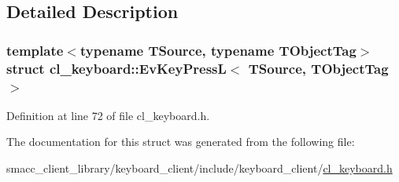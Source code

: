 \subsection{Detailed Description}
\subsubsection*{template$<$typename T\+Source, typename T\+Object\+Tag$>$\newline
struct cl\+\_\+keyboard\+::\+Ev\+Key\+Press\+L$<$ T\+Source, T\+Object\+Tag $>$}



Definition at line 72 of file cl\+\_\+keyboard.\+h.



The documentation for this struct was generated from the following file\+:\begin{DoxyCompactItemize}
\item 
smacc\+\_\+client\+\_\+library/keyboard\+\_\+client/include/keyboard\+\_\+client/\hyperlink{cl__keyboard_8h}{cl\+\_\+keyboard.\+h}\end{DoxyCompactItemize}

